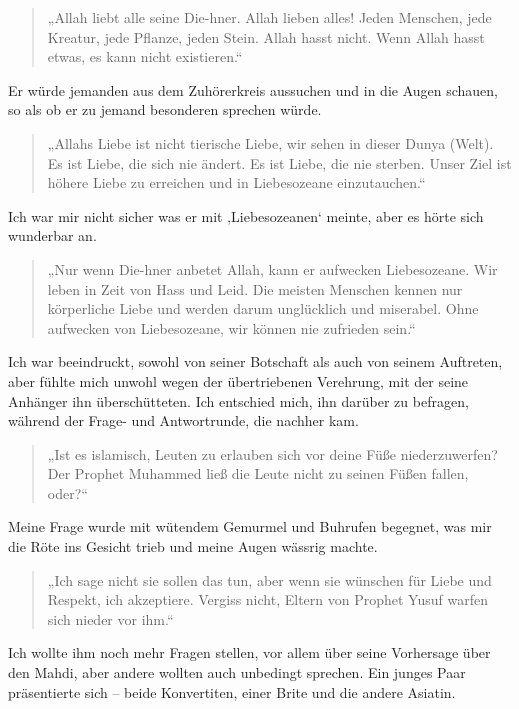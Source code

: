 \documentclass[12pt]{memoir}
\begin{document}
\begin{quote}
„Allah liebt alle seine Die-hner.
Allah lieben alles!
Jeden Menschen, jede Kreatur, jede Pflanze, jeden Stein.
Allah hasst nicht.
Wenn Allah hasst etwas, es kann nicht existieren.“
\end{quote}

Er würde jemanden aus dem Zuhörerkreis aussuchen und in die Augen schauen,
so als ob er zu jemand besonderen sprechen würde.

\begin{quote}
„Allahs Liebe ist nicht tierische Liebe, wir sehen in dieser Dunya (Welt).
Es ist Liebe, die sich nie ändert.
Es ist Liebe, die nie sterben.
Unser Ziel ist höhere Liebe zu erreichen und in Liebesozeane einzutauchen.“
\end{quote}

Ich war mir nicht sicher was er mit ‚Liebesozeanen‘ meinte,
aber es hörte sich wunderbar an.

\begin{quote}
„Nur wenn Die-hner anbetet Allah, kann er aufwecken Liebesozeane.
Wir leben in Zeit von Hass und Leid.
Die meisten Menschen kennen nur körperliche Liebe
und werden darum unglücklich und miserabel.
Ohne aufwecken von Liebesozeane, wir können nie zufrieden sein.“
\end{quote}

Ich war beeindruckt, sowohl von seiner Botschaft als auch von seinem Auftreten,
aber fühlte mich unwohl wegen der übertriebenen Verehrung,
mit der seine Anhänger ihn überschütteten.
Ich entschied mich, ihn darüber zu befragen,
während der Frage- und Antwortrunde, die nachher kam.

\begin{quote}
„Ist es islamisch, Leuten zu erlauben sich vor deine Füße niederzuwerfen?
Der Prophet Muhammed ließ die Leute nicht zu seinen Füßen fallen, oder?“
\end{quote}

Meine Frage wurde mit wütendem Gemurmel und Buhrufen begegnet,
was mir die Röte ins Gesicht trieb und meine Augen wässrig machte.

\begin{quote}
„Ich sage nicht sie sollen das tun,
aber wenn sie wünschen für Liebe und Respekt, ich akzeptiere.
Vergiss nicht, Eltern von Prophet Yusuf warfen sich nieder vor ihm.“
\end{quote}

Ich wollte ihm noch mehr Fragen stellen,
vor allem über seine Vorhersage über den Mahdi,
aber andere wollten auch unbedingt sprechen.
Ein junges Paar präsentierte sich –
beide Konvertiten, einer Brite und die andere Asiatin.
\end{document}
